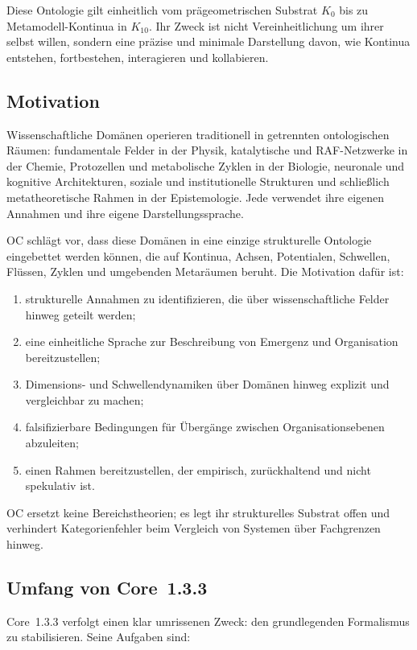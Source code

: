 Diese Ontologie gilt einheitlich vom prägeometrischen Substrat \(K_0\) bis zu Metamodell-Kontinua in \(K_{10}\). Ihr Zweck ist nicht Vereinheitlichung um ihrer selbst willen, sondern eine präzise und minimale Darstellung davon, wie Kontinua entstehen, fortbestehen, interagieren und kollabieren.

\subsection{Motivation}

Wissenschaftliche Domänen operieren traditionell in getrennten ontologischen Räumen: fundamentale Felder in der Physik, katalytische und RAF-Netzwerke in der Chemie, Protozellen und metabolische Zyklen in der Biologie, neuronale und kognitive Architekturen, soziale und institutionelle Strukturen und schließlich metatheoretische Rahmen in der Epistemologie. Jede verwendet ihre eigenen Annahmen und ihre eigene Darstellungssprache.

OC schlägt vor, dass diese Domänen in eine einzige strukturelle Ontologie eingebettet werden können, die auf Kontinua, Achsen, Potentialen, Schwellen, Flüssen, Zyklen und umgebenden Metaräumen beruht. Die Motivation dafür ist:

\begin{enumerate}
    \item strukturelle Annahmen zu identifizieren, die über wissenschaftliche Felder hinweg geteilt werden;
    \item eine einheitliche Sprache zur Beschreibung von Emergenz und Organisation bereitzustellen;
    \item Dimensions- und Schwellendynamiken über Domänen hinweg explizit und vergleichbar zu machen;
    \item falsifizierbare Bedingungen für Übergänge zwischen Organisationsebenen abzuleiten;
    \item einen Rahmen bereitzustellen, der empirisch, zurückhaltend und nicht spekulativ ist.
\end{enumerate}

OC ersetzt keine Bereichstheorien; es legt ihr strukturelles Substrat offen und verhindert Kategorienfehler beim Vergleich von Systemen über Fachgrenzen hinweg.

\subsection{Umfang von Core~1.3.3}

Core~1.3.3 verfolgt einen klar umrissenen Zweck: den grundlegenden Formalismus zu stabilisieren. Seine Aufgaben sind:

